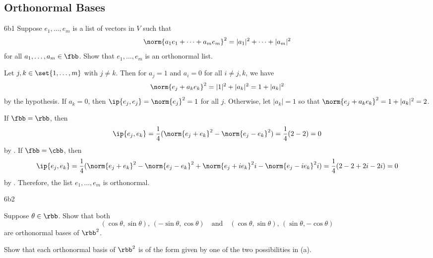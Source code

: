 \subsection{Orthonormal Bases}

\begin{exercise}{6b1}
    Suppose $e_1, \ldots, e_m$ is a list of vectors in $V$ such that
    \[
        \norm{a_1 e_1 + \cdots + a_m e_m}^2 = |a_1|^2 + \cdots + |a_m|^2
    \]
    for all $a_1, \ldots, a_m \in \fbb$.
    Show that $e_1, \ldots, e_m$ is an orthonormal list.

\end{exercise}

\begin{sol}
    Let $j, k \in \set{1, \ldots, m}$ with $j \neq k$.
    Then for $a_j = 1$ and $a_i = 0$ for all $i \neq j, k$, we have
    \[
        \norm{e_j + a_k e_k}^2 = |1|^2 + |a_k|^2 = 1 + |a_k|^2
    \]
    by the hypothesis.
    If $a_k = 0$, then $\ip{e_j, e_j} = \norm{e_j}^2 = 1$ for all $j$.
    Otherwise, let $|a_k| = 1$ so that $\norm{e_j + a_k e_k}^2 = 1 + |a_k|^2 = 2$.

    If $\fbb = \rbb$, then
    \[
        \ip{e_j, e_k} = \frac{1}{4} (\norm{e_j + e_k}^2 - \norm{e_j - e_k}^2) = \frac{1}{4} (2 - 2) = 0
    \]
    by . If $\fbb = \cbb$, then
    \[
        \ip{e_j, e_k} = \frac{1}{4}(\norm{e_j + e_k}^2 - \norm{e_j - e_k}^2 + \norm{e_j + i e_k}^2i - \norm{e_j - i e_k}^2i) = \frac{1}{4}(2 - 2 + 2i - 2i) = 0
    \]
    by .
    Therefore, the list $e_1, \ldots, e_m$ is orthonormal.
\end{sol}

\begin{exercise}{6b2}
    \begin{subexercises}
        \item Suppose $\theta \in \rbb$.
        Show that both
        \[
            (\cos\theta, \sin\theta),\, (-\sin\theta, \cos\theta) \quad \text{and} \quad (\cos\theta, \sin\theta),\, (\sin\theta, -\cos\theta)
        \]
        are orthonormal bases of $\rbb^2$.
        \item Show that each orthonormal basis of $\rbb^2$ is of the form given by one of the two possibilities in (a).
    \end{subexercises}
\end{exercise}


